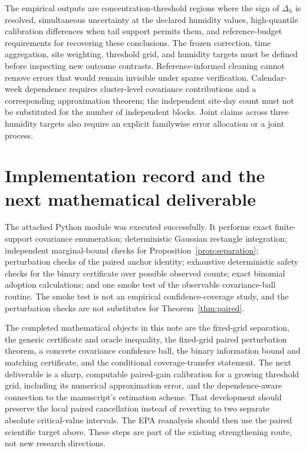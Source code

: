 \documentclass[11pt]{article}
\theoremstyle{remark}\newtheorem{remark}[theorem]{Remark}
\begin{document}
The empirical outputs are concentration-threshold regions where the sign of $\Delta_h$ is resolved, simultaneous uncertainty at the declared humidity values, high-quantile calibration differences when tail support permits them, and reference-budget requirements for recovering these conclusions.
The frozen correction, time aggregation, site weighting, threshold grid, and humidity targets must be defined before inspecting new outcome contrasts. Reference-informed cleaning cannot remove errors that would remain invisible under sparse verification.
Calendar-week dependence requires cluster-level covariance contributions and a corresponding approximation theorem; the independent site-day count must not be substituted for the number of independent blocks. Joint claims across three humidity targets also require an explicit familywise error allocation or a joint process.

\section{Implementation record and the next mathematical deliverable}
The attached Python module was executed successfully. It performs exact finite-support covariance enumeration; deterministic Gaussian rectangle integration; independent marginal-bound checks for Proposition~\ref{prop:separation}; perturbation checks of the paired anchor identity; exhaustive deterministic safety checks for the binary certificate over possible observed counts; exact binomial adoption calculations; and one smoke test of the observable covariance-ball routine.
The smoke test is not an empirical confidence-coverage study, and the perturbation checks are not substitutes for Theorem~\ref{thm:paired}.

The completed mathematical objects in this note are the fixed-grid separation, the generic certificate and oracle inequality, the fixed-grid paired perturbation theorem, a concrete covariance confidence ball, the binary information bound and matching certificate, and the conditional coverage-transfer statement.
The next deliverable is a sharp, computable paired-gain calibration for a growing threshold grid, including its numerical approximation error, and the dependence-aware connection to the manuscript's estimation scheme. That development should preserve the local paired cancellation instead of reverting to two separate absolute critical-value intervals.
The EPA reanalysis should then use the paired scientific target above. These steps are part of the existing strengthening route, not new research directions.
\end{document}
